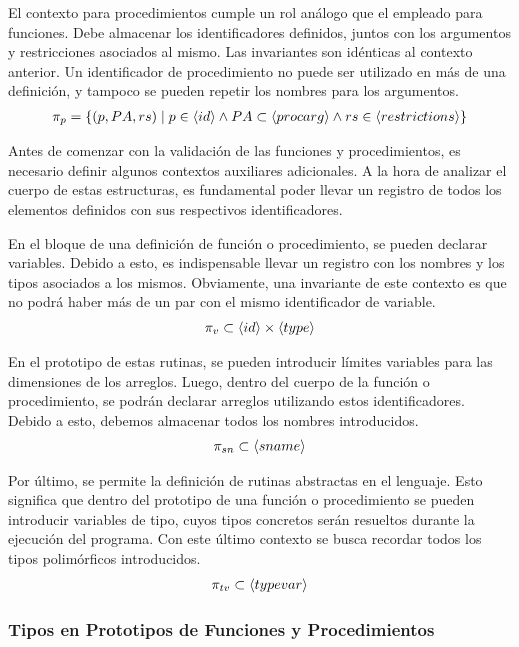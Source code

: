 \documentclass{article}
\begin{document}
El contexto para procedimientos cumple un rol análogo que el empleado para funciones.
Debe almacenar los identificadores definidos, juntos con los argumentos y restricciones asociados al mismo.
Las invariantes son idénticas al contexto anterior.
Un identificador de procedimiento no puede ser utilizado en más de una definición, y tampoco se pueden repetir los nombres para los argumentos.
\begin{multline*}
\pi_{p} =
\{
(p, PA, rs) \mid
p \in \langle id \rangle
\wedge
PA \subset \langle procarg \rangle
\wedge
rs \in \langle restrictions \rangle
\}
\end{multline*}

Antes de comenzar con la validación de las funciones y procedimientos, es necesario definir algunos contextos auxiliares adicionales.
A la hora de analizar el cuerpo de estas estructuras, es fundamental poder llevar un registro de todos los elementos definidos con sus respectivos identificadores.

En el bloque de una definición de función o procedimiento, se pueden declarar variables.
Debido a esto, es indispensable llevar un registro con los nombres y los tipos asociados a los mismos.
Obviamente, una invariante de este contexto es que no podrá haber más de un par con el mismo identificador de variable.
\begin{gather*}
\pi_{v} \subset \langle id \rangle \times \langle type \rangle
\end{gather*}

En el prototipo de estas rutinas, se pueden introducir límites variables para las dimensiones de los arreglos.
Luego, dentro del cuerpo de la función o procedimiento, se podrán declarar arreglos utilizando estos identificadores.
Debido a esto, debemos almacenar todos los nombres introducidos.
\begin{gather*}
\pi_{sn} \subset \langle sname \rangle    
\end{gather*}

Por último, se permite la definición de rutinas abstractas en el lenguaje.
Esto significa que dentro del prototipo de una función o procedimiento se pueden introducir variables de tipo, cuyos tipos concretos serán resueltos durante la ejecución del programa.
Con este último contexto se busca recordar todos los tipos polimórficos introducidos.
\begin{gather*}
\pi_{tv} \subset \langle typevar \rangle
\end{gather*}

\subsubsection{Tipos en Prototipos de Funciones y Procedimientos}
\end{document}
